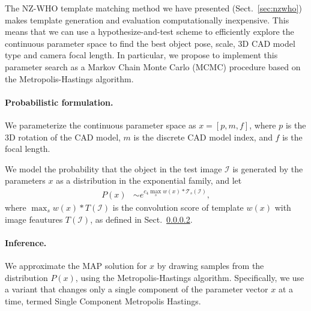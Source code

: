 The NZ-WHO template matching method we have presented
(Sect.~\ref{sec:nzwho}) makes template generation and evaluation
computationally inexpensive. This means that we can use a
hypothesize-and-test scheme to efficiently explore the continuous
parameter space to find the best object pose, scale, 3D CAD model type
and camera focal length.
%
In particular, we propose to implement this parameter search as a
Markov Chain Monte Carlo (MCMC) procedure based on the
Metropolis-Hastings algorithm.

\paragraph{Probabilistic formulation.}
We parameterize the continuous parameter space as  $x = [p, m, f]$,
where $p$ is the 3D rotation of the CAD model, $m$ is the discrete CAD
model index, and $f$ is the focal length.

We model the probability that the object in the test image
$\mathcal{I}$ is generated by the parameters $x$ as a distribution in
the exponential family, and let
\begin{align}
    P(x) & \sim e^{ c_4 \max_{s} w(x) \ast \mathcal{T}_s(\mathcal{I})},
\end{align}
where $\max_{s} w(x) \ast T(\mathcal{I})$ is the convolution score of
template $w(x)$ with image feautures $T(\mathcal{I})$, as defined
in Sect.~\ref{}.

\paragraph{Inference.}
We approximate the MAP solution for $x$ by drawing samples from the
distribution $P(x)$, using the Metropolis-Hastings
algorithm. Specifically, we use a variant that changes only a single
component of the parameter vector $x$ at a time, termed Single
Component Metropolis Hastings.

